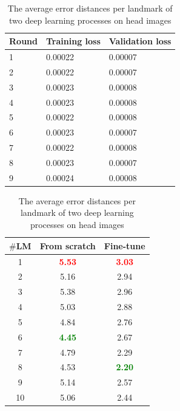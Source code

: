 \documentclass[review]{elsarticle}
\begin{document}
\begin{table}[htbp]
\begin{minipage}[t]{0.45\textwidth}
	\centering
	\begin{tabular}{l p{1.5cm} p{1.5cm}}
	Round & Training loss & Validation loss \\ \hline
	1 & 0.00022 & 0.00007  \\ \hline
	2 & 0.00022 & 0.00007 \\ \hline
	3 & 0.00023 & 0.00008 \\ \hline
	4 & 0.00023 & 0.00008 \\ \hline
	5 & 0.00022 & 0.00008 \\ \hline
	6 & 0.00023 & 0.00007 \\ \hline
	7 & 0.00022 & 0.00008 \\ \hline
	8 & 0.00023 & 0.00007 \\ \hline
	9 & 0.00024 & 0.00008 \\ \hline
	\end{tabular}
	\caption{The losses during fine-tuning model on head dataset}
	\label{tblfthead}
\end{minipage}
\hfill
\begin{minipage}[t]{0.45\textwidth}
\centering
\begin{tabular}{|c|c|c|}
\hline
\textbf{$\#$LM} & \textbf{From scratch} & \textbf{Fine-tune} \\ \hline
1 & \textcolor{red}{\textbf{5.53}} & \textcolor{red}{\textbf{3.03}}  \\ \hline
2 & 5.16 & 2.94  \\ \hline
3 & 5.38  & 2.96 \\ \hline
4 & 5.03  & 2.88 \\ \hline
5 & 4.84  & 2.76 \\ \hline
6 & \textcolor{green}{\textbf{4.45}}  & 2.67 \\ \hline
7 & 4.79  & 2.29 \\ \hline
8 & 4.53  & \textcolor{green}{\textbf{2.20}} \\ \hline
9 & 5.14  & 2.57 \\ \hline
10 & 5.06  & 2.44 \\ \hline
\end{tabular}
\caption{The average error distances per landmark of two deep learning processes on head images}
\label{tblcmphead}
\end{minipage}
\end{table}
\end{document}
